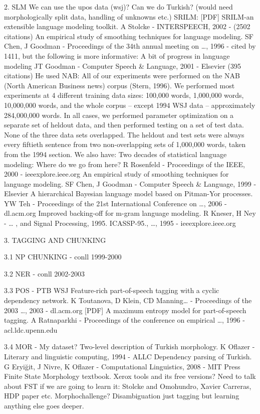 \documentclass[ignorenonframetext]{beamer}
\begin{document}
2. SLM
We can use the upos data (wsj)?
Can we do Turkish?  (would need morphologically split data, handling of unknowns etc.)
SRILM: [PDF] SRILM-an extensible language modeling toolkit. A Stolcke - INTERSPEECH, 2002 - (2502 citations)
An empirical study of smoothing techniques for language modeling. SF Chen, J Goodman - Proceedings of the 34th annual meeting on …, 1996 - cited by 1411, but the following is more informative:
A bit of progress in language modeling JT Goodman - Computer Speech & Language, 2001 - Elsevier (395 citations)
He used NAB:
All of our experiments were performed on the NAB (North American Business news) corpus (Stern, 1996). We performed most experiments at 4 diﬀerent
training data sizes: 100,000 words, 1,000,000 words, 10,000,000 words, and the
whole corpus – except 1994 WSJ data – approximately 284,000,000 words. In
all cases, we performed parameter optimization on a separate set of heldout
data, and then performed testing on a set of test data. None of the three data
sets overlapped. The heldout and test sets were always every ﬁftieth sentence
from two non-overlapping sets of 1,000,000 words, taken from the 1994 section.
  We also have:
Two decades of statistical language modeling: Where do we go from here?  R Rosenfeld - Proceedings of the IEEE, 2000 - ieeexplore.ieee.org
An empirical study of smoothing techniques for language modeling. SF Chen, J Goodman - Computer Speech & Language, 1999 - Elsevier
A hierarchical Bayesian language model based on Pitman-Yor processes.  YW Teh - Proceedings of the 21st International Conference on …, 2006 - dl.acm.org
Improved backing-off for m-gram language modeling.  R Kneser, H Ney - … , and Signal Processing, 1995. ICASSP-95., …, 1995 - ieeexplore.ieee.org

3. TAGGING AND CHUNKING

3.1 NP CHUNKING 
- conll 1999-2000

3.2 NER
- conll 2002-2003

3.3 POS
- PTB WSJ
Feature-rich part-of-speech tagging with a cyclic dependency network. K Toutanova, D Klein, CD Manning… - Proceedings of the 2003 …, 2003 - dl.acm.org
[PDF] A maximum entropy model for part-of-speech tagging.  A Ratnaparkhi - Proceedings of the conference on empirical …, 1996 - acl.ldc.upenn.edu

3.4 MOR
- My dataset?
Two-level description of Turkish morphology.  K Oflazer - Literary and linguistic computing, 1994 - ALLC
Dependency parsing of Turkish. G Eryiğit, J Nivre, K Oflazer - Computational Linguistics, 2008 - MIT Press
Finite State Morphology textbook.
Xerox tools and its free versions?
Need to talk about FST if we are going to learn it:
Stolcke and Omohundro, Xavier Carreras, HDP paper etc.
Morphochallenge?
Disambiguation just tagging but learning anything else goes deeper.
\end{document}
